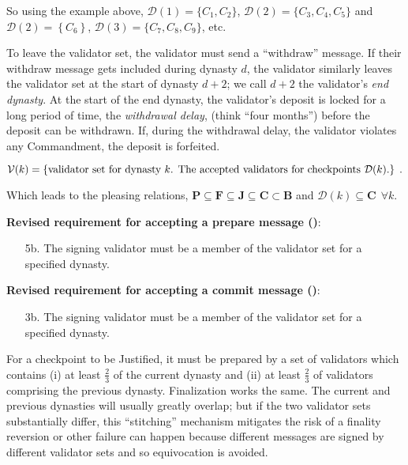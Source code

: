 \documentclass[12pt]{article}
\begin{document}
So using the example above, $\mathcal{D}(1) = \{ C_1, C_2 \}$,  $\mathcal{D}(2) = \{C_3, C_4, C_5\}$ and $\mathcal{D}(2) = \left\{ C_6 \right\}$, $\mathcal{D}(3) = \{ C_7, C_8, C_9\}$, etc.




To leave the validator set, the validator must send a ``withdraw'' message. If their withdraw message gets included during dynasty $d$, the validator similarly leaves the validator set at the start of dynasty $d+2$; we call $d+2$ the validator's \textit{end dynasty}.  At the start of the end dynasty, the validator's deposit is locked for a long period of time, the \textit{withdrawal delay}, (think ``four months'') before the deposit can be withdrawn.  If, during the withdrawal delay, the validator violates any Commandment, the deposit is forfeited.


\begin{equation}
    \mathcal{V}(k) = \left\{ \textnormal{validator set for dynasty $k$.  The accepted validators for checkpoints $\mathcal{D}(k)$.}\right\} \; .
\end{equation}


Which leads to the pleasing relations, $\mathbf{P} \subseteq \mathbf{F} \subseteq \mathbf{J} \subseteq \mathbf{C} \subset \mathbf{B}$ and $\mathcal{D}(k) \subseteq \mathbf{C} \ \ \forall k$.

\textbf{Revised requirement for accepting a prepare message ()}:
\begin{enumerate}
\item[5b.] The signing validator must be a member of the validator set for a specified dynasty.
\end{enumerate}


\textbf{Revised requirement for accepting a commit message ()}:
\begin{enumerate}
\item[3b.] The signing validator must be a member of the validator set for a specified dynasty.
\end{enumerate}


For a checkpoint to be Justified, it must be prepared by a set of validators which contains (i) at least $\frac{2}{3}$ of the current dynasty and (ii) at least $\frac{2}{3}$ of validators comprising the previous dynasty. Finalization works the same. The current and previous dynasties will usually greatly overlap; but if the two validator sets substantially differ, this ``stitching'' mechanism mitigates the risk of a finality reversion or other failure can happen because different messages are signed by different validator sets and so equivocation is avoided.
\end{document}
